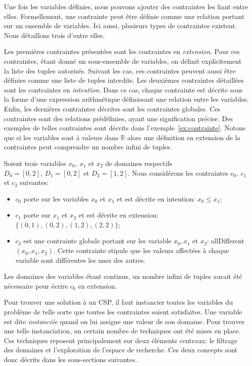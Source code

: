Une fois les variables définies, nous pouvons ajouter des contraintes
les liant entre elles. Formellement, une contrainte peut être définie
comme une relation portant sur un ensemble de variables.  Ici aussi,
plusieurs types de contraintes existent. Nous détaillons trois d'entre
elles.

Les premières contraintes présentées sont les contraintes en {\it
  extension}. Pour ces contraintes, étant donné un sous-ensemble de
variables, on définit explicitement la liste des tuples
autorisés. Suivant les cas, ces contraintes peuvent aussi être définies
comme une liste de tuples interdits. Les deuxièmes contraintes
détaillées sont les contraintes en {\it intention}. Dans ce cas,
chaque contrainte est décrite sous la forme d'une expression arithmétique
définissant  une relation entre les variables. Enfin, les dernières
contraintes décrites sont les contraintes globales. Ces contraintes
sont des relations prédéfinies, ayant une signification précise. Des
exemples de telles contraintes sont décrits dans
l'exemple~\ref{ex:contrainte}. Notons que si les variables sont à
valeurs dans $\mathbb{R}$ alors une définition en extension de la
contraintes peut comprendre un nombre infini de tuples.

\begin{ex}
\label{ex:contrainte}
  Soient trois variables $x_0,\ x_1$ et $x_2$ de domaines respectifs
  $D_0=[0,2],\ 
  D_1=[0,2]$ et $D_2=[1,2]$. 
  Nous considérons les contraintes $c_0,\ c_1$ et $c_2$ suivantes:
  \begin{itemize}
  \item $c_0$ porte sur les variables $x_0$ et $x_1$ et est décrite en
    intention: $x_0 \le x_1$; 
  \item $c_1$ porte sur $x_1$ et $x_2$ et est décrite en extension:
    $\{(0,1) , (0,2), (1,2), (2,2)\}$; 
  \item $c_2$ est une contrainte  globale portant sur les variable
    $x_0,x_1$ et $x_2$: allDifferent$(x_0,x_1,x_2)$. Cette contrainte
    stipule que les valeurs affectées à chaque variable sont
    différentes les unes des autres. 
  \end{itemize}
  Les domaines des variables étant continus, un nombre infini de
tuples aurait été nécessaire pour écrire $c_0$ en extension.
\end{ex}

Pour trouver une solution à un CSP, il faut instancier toutes les
variables du problème de telle sorte que toutes les contraintes
soient satisfaites. Une variable est dite {\it instanciée} quand on
lui assigne une valeur de son domaine. Pour trouver une telle
instanciation, un certain nombre de techniques ont été mises en
place. Ces techniques reposent principalement sur deux éléments
centraux: le filtrage des domaines et l'exploration de l'espace de
recherche. Ces deux concepts sont donc décrits dans les sous-sections 
suivantes. 



